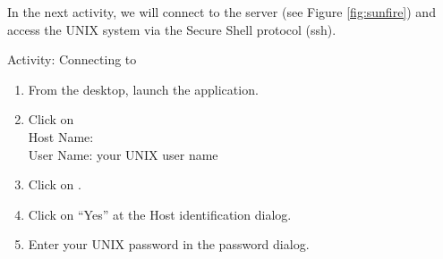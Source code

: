 In the next activity, we will connect to the  server (see Figure
\ref{fig:sunfire}) and access the UNIX system via the Secure Shell protocol
(ssh).

\begin{frame}{Activity: Connecting to }
\begin{enumerate}
\item From the desktop, launch the  application. 
\item Click on \\ 
Host Name: \\ 
User Name: your UNIX user name
\item Click on .
\item Click on ``Yes'' at the Host identification dialog.  
\item Enter your UNIX password in the password dialog.  
\end{enumerate}
\end{frame}




